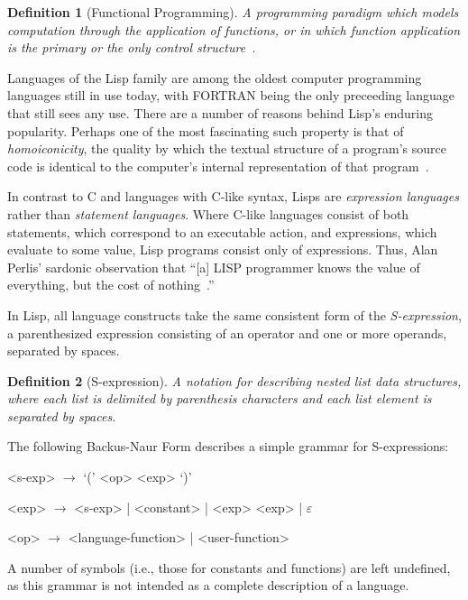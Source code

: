 \documentclass[11pt,a4paper]{article}
\theoremstyle{break}
\newtheorem{defn}{Definition}
\begin{document}
\begin{defn}[Functional Programming]
A programming paradigm which models computation through the application of functions, or in which function application is the primary or the only control structure~\cite{Wise:2003:FP:1074100.1074416,hughes1989functional}.
\end{defn}

Languages of the Lisp family are among the oldest computer programming languages still in use today, with FORTRAN being the only preceeding language that still sees any use. There are a number of reasons behind Lisp's enduring popularity. Perhaps one of the most fascinating such property is that of \textit{homoiconicity}, the quality by which the textual structure of a program's source code is identical to the computer's internal representation of that program~\cite{vanderhart2010macros,sicp}.

In contrast to C and languages with C-like syntax, Lisps are \textit{expression languages} rather than \textit{statement languages}. Where C-like languages consist of both statements, which correspond to an executable action, and expressions, which evaluate to some value, Lisp programs consist only of expressions. Thus, Alan Perlis' sardonic observation that ``[a] LISP programmer knows the value of everything, but the cost of nothing~\cite{Perlis:1982:SFE:947955.1083808}.''

In Lisp, all language constructs take the same consistent form of the \textit{S-expression}, a parenthesized expression consisting of an operator and one or more operands, separated by spaces.

\begin{defn}[S-expression]
A notation for describing nested list data structures, where each list is delimited by parenthesis characters and each list element is separated by spaces.
\end{defn}

The following Backus-Naur Form describes a simple grammar for S-expressions:
\FloatBarrier
\begin{listing}[h!]
    \centering
    \begin{grammar}
      <s-exp> $\to$ `(' <op> <exp> `)'

      <exp>  $\to$ <s-exp>  | <constant> | <exp> <exp> | $\varepsilon$

      <op>  $\to$ <language-function> | <user-function>
    \end{grammar}
    \caption{Backus-Naur form for a S-expression grammar~\cite{r6rs}.}
\end{listing}
\FloatBarrier
A number of symbols (i.e., those for constants and functions) are left undefined, as this grammar is not intended as a complete description of a language.
\end{document}
